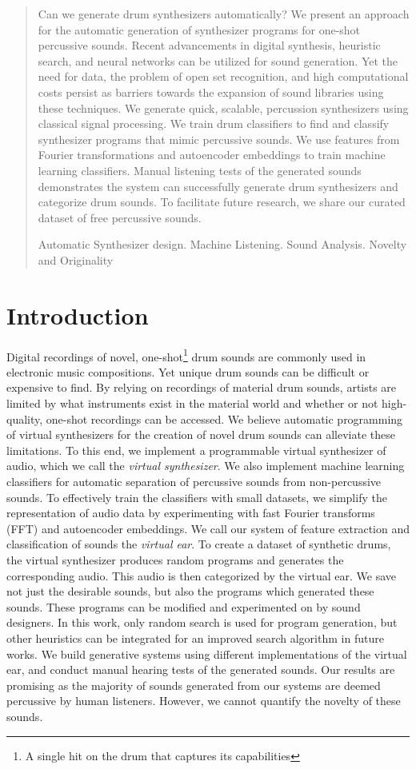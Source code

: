 \documentclass[runningheads,a4paper]{llncs}
\newcommand{\keywords}[1]{\par\addvspace\baselineskip
\noindent\keywordname\enspace\ignorespaces#1}
\begin{document}
\begin{abstract}
Can we generate drum synthesizers automatically?
We present an approach for the automatic generation of synthesizer programs for one-shot percussive sounds. 
Recent advancements in digital synthesis, heuristic search, and neural networks can be utilized for sound generation. 
Yet the need for data, the problem of open set recognition, and high computational costs persist as barriers towards the expansion of sound libraries using these techniques. 
We generate quick, scalable, percussion synthesizers using classical signal processing. 
We train drum classifiers to find and classify synthesizer programs that mimic percussive sounds. 
We use features from Fourier transformations and autoencoder embeddings to train machine learning classifiers.
Manual listening tests of the generated sounds demonstrates the system can successfully generate drum synthesizers and categorize drum sounds.
To facilitate future research, we share our curated dataset of free percussive sounds.
\keywords{Automatic Synthesizer design. Machine Listening. Sound Analysis. Novelty and Originality}
\end{abstract}


\section{Introduction} 
Digital recordings of novel, one-shot\footnote{A single hit on the drum that captures its capabilities} drum sounds are commonly used in  electronic music compositions. Yet unique drum sounds can be difficult or expensive to find. By relying on recordings of material drum sounds, artists are limited by what instruments exist in the material world and whether or not high-quality, one-shot recordings can be accessed. We believe automatic programming of virtual synthesizers for the creation of novel drum sounds can alleviate these limitations. To this end, we implement a programmable virtual synthesizer of audio, which we call the \emph{virtual synthesizer}. We also implement machine learning classifiers for automatic separation of percussive sounds from non-percussive sounds. To effectively train the classifiers with small datasets, we simplify the representation of audio data by experimenting with fast Fourier transforms (FFT) and autoencoder embeddings. We call our system of feature extraction and classification of sounds the \emph{virtual ear}. To create a dataset of synthetic drums, the virtual synthesizer produces random programs and generates the corresponding audio. This audio is then categorized by the virtual ear. We save not just the desirable sounds, but also the programs which generated these sounds. These programs can be modified and experimented on by sound designers. In this work, only random search is used for program generation, but other heuristics can be integrated for an improved search algorithm in future works. We build generative systems using different implementations of the virtual ear, and conduct manual hearing tests of the generated sounds. Our results are promising as the majority of sounds generated from our systems are deemed percussive by human listeners. However, we cannot quantify the novelty of these sounds. 
\end{document}
